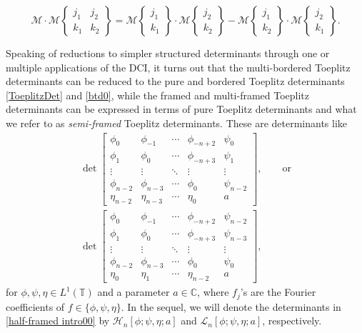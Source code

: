 \documentclass[pdftex]{sigma}
\numberwithin{equation}{section}
\newcommand{\C}{{\mathbb C}}
\newcommand{\T}{{\mathbb T}}
\begin{document}
\begin{equation}\label{DODGSON}
	\mathscr{M} \cdot \mathscr{M}\left\lbrace \begin{matrix} j_1 & j_2 \\ k_1& k_2 \end{matrix} \right\rbrace = \mathscr{M}\left\lbrace \begin{matrix} j_1 \\ k_1 \end{matrix} \right\rbrace \cdot \mathscr{M}\left\lbrace \begin{matrix} j_2 \\ k_2 \end{matrix} \right\rbrace - \mathscr{M}\left\lbrace \begin{matrix} j_1 \\ k_2 \end{matrix} \right\rbrace \cdot \mathscr{M}\left\lbrace \begin{matrix} j_2 \\ k_1 \end{matrix} \right\rbrace.
\end{equation}

Speaking of reductions to simpler structured determinants through one or multiple applications of the DCI, it turns out that the multi-bordered Toeplitz determinants can be reduced to the pure and bordered Toeplitz determinants \eqref{ToeplitzDet} and \eqref{btd0}, while the framed and multi-framed Toeplitz determinants can be expressed in terms of pure Toeplitz determinants and what we refer to as \textit{semi-framed} Toeplitz determinants. These are determinants like
\begin{gather}
	\det \begin{bmatrix}
		\phi_0& \phi_{-1} & \cdots & \phi_{-n+2} & \psi_{0} \\
		\phi_{1}& \phi_0 & \cdots & \phi_{-n+3} & \psi_{1} \\
		\vdots & \vdots & \ddots & \vdots & \vdots \\
		\phi_{n-2} & \phi_{n-3} & \cdots & \phi_{0} & \psi_{n-2} \\
		\eta_{n-2} & \eta_{n-3} & \cdots & \eta_{0} & a
	\end{bmatrix},\qquad \text{or}\nonumber\\
\det \begin{bmatrix}
		\phi_0& \phi_{-1} & \cdots & \phi_{-n+2} & \psi_{n-2} \\
		\phi_{1}& \phi_0 & \cdots & \phi_{-n+3} & \psi_{n-3} \\
		\vdots & \vdots & \ddots & \vdots & \vdots \\
		\phi_{n-2} & \phi_{n-3} & \cdots & \phi_{0} & \psi_{0} \\
		\eta_{0} & \eta_{1} & \cdots & \eta_{n-2} & a
	\end{bmatrix},\label{half-framed intro00}
\end{gather}
for $\phi,\psi,\eta \in L^1(\T)$ and a parameter $a \in \C$, where $f_j$'s are the Fourier coefficients of ${f \in \{ \phi, \psi, \eta \}}$. In the sequel, we will denote the determinants in \eqref{half-framed intro00} by $\mathscr{H}_n[\phi;\psi,\eta;a]$ and $\mathscr{L}_n[\phi;\psi,\eta;a]$, respectively.
\end{document}
